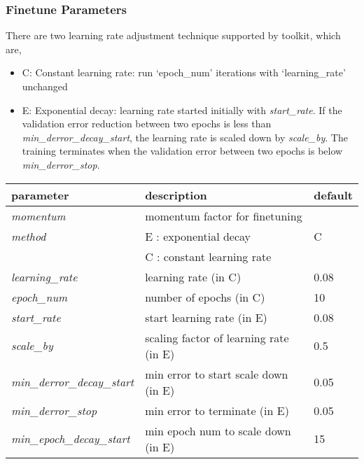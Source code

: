 \subsubsection{Finetune Parameters}
\label{subsec:finetuneparam}
There are two learning rate adjustment technique supported by toolkit, which are,
\hspace{-2em}
\begin{itemize}
\item C: Constant learning rate: run `epoch\_num' iterations with `learning\_rate' unchanged
\item E: Exponential decay: learning rate started initially with \emph{start\_rate}.  If the validation error reduction between two epochs is less than \emph{min\_derror\_decay\_start}, the learning rate is scaled down by \emph{scale\_by}.  The training terminates when the validation error between two epochs is below \emph{min\_derror\_stop}.
\end{itemize}
\begin{table}[h]
\centering
\begin{tabular}{|l|l|l|}
\hline
\textbf{parameter}	& \textbf{description} 				& \textbf{default}\\  \hline
\emph{momentum} 			& momentum factor for finetuning 				& \\
\emph{method} 				& E : exponential decay 						& C\\
					& C : constant learning rate 						& \\
\emph{learning\_rate}   	& learning rate (in C) 							& 0.08\\
\emph{epoch\_num}          & number of epochs (in C) 			 		& 10\\
\emph{start\_rate}         & start learning rate (in E) 					& 0.08 \\
\emph{scale\_by}           & scaling factor of learning rate (in E)		& 0.5\\
\emph{min\_derror\_decay\_start}& min error to start scale down (in E) 	& 0.05\\
\emph{min\_derror\_stop}   & min error to terminate (in E) 	& 0.05 \\
\emph{min\_epoch\_decay\_start}  & min epoch num to scale down (in E)	& 15\\
\hline
\end{tabular}
\end{table} 
 
\clearpage
